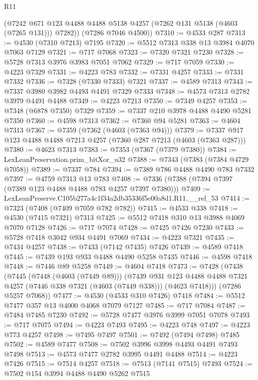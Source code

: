 \begin{lexlean}{R11}
\begin{coremodule}
        (@7242 @671 @123 @4488 @4488 @5138 @4257 (@7262 @131 @5138 (@4603 (@7265 @131))) @7282))
      (@7286 @7046 @4500))
@7310 := @4533 @287
@7313 := @4530 (@7310 @7213) @7195
@7320 := @5512 @7313 @338 @13 @3984 @4070 @7063 @7129
@7321 := @717 @7068
@7323 := @7320 @7321 @7230
@7328 := @5728 @7313 @3976 @3983 @7051 @7062
@7329 := @717 @7059
@7330 := @4223 @7329
@7331 := @4223 @783
@7332 := @7331 @4257
@7333 := @7331 @7332
@7336 := @7328 (@7330 @7333) @7321
@7337 := @4589 @7313
@7343 := @7337 @3980 @3982 @4493 @4491 @7329 @7333
@7348 := @4573 @7313 @2782 @3979 @4491 @4488
@7349 := @4223 @7213
@7350 := @7349 @4257
@7353 := @7348 (@6878 @7350) @7329
@7359 := @7337 @210 @3978 @4488 @4490 @5281 @7350
@7360 := @4598 @7313
@7362 := @7360 @94 @5281
@7363 := @4604 @7313
@7367 := @7359 (@7362 (@4603 (@7363 @94)))
@7379 := @7337 @917 @123 @4488 @4488 @7213 @4257 (@7360 @287 @7213 (@4603 (@7363 @287)))
@7380 := @4623 @7313
@7383 := @7353 (@7367 (@7379 @7380))
@7384 := LexLeanPreservation.prim_bitXor_u32
@7388 := @7343 (@7383 (@7384 @4729 @7058))
@7389 := @7337 @784
@7394 := @7389 @786 @4488 @4490 @783 @7332
@7397 := @4759 @7313 @13 @783
@7408 := @7336 (@7388 (@7394 @7397 (@7389 @123 @4488 @4488 @783 @4257 @7397 @7380)))
@7409 := LexLeanPreserve.C105b277a4c1f34a2db35336f5e00a8d1.R11.__rel_53
@7414 := @7323 (@7408 (@7409 @7059 @782 @782))
@7415 := @4533 @338
@7418 := @4530 (@7415 @7321) @7313
@7425 := @5512 @7418 @310 @13 @3988 @4069 @7070 @7128
@7426 := @717 @7074
@7428 := @7425 @7426 @7230
@7433 := @5728 @7418 @3042 @934 @4491 @7069
@7434 := @4223 @7321
@7435 := @7434 @4257
@7438 := @7433 (@7142 @7435) @7426
@7439 := @4589 @7418
@7445 := @7439 @193 @933 @4488 @4490 @5258 @7435
@7446 := @4598 @7418
@7448 := @7446 @89 @5258
@7449 := @4604 @7418
@7473 := @7428
    (@7438
      (@7445
        (@7448 (@4603 (@7449 @89)))
        (@7439
          @931
          @123
          @4488
          @4488
          @7321
          @4257
          (@7446 @338 @7321 (@4603 (@7449 @338)))
          (@4623 @7418)))
      (@7286 @5257 @7068))
@7477 := @4530 (@4533 @310 @7426) @7418
@7484 := @5512 @7477 @357 @13 @4000 @4068 @7079 @7127
@7485 := @717 @7084
@7487 := @7484 @7485 @7230
@7492 := @5728 @7477 @3976 @3999 @7051 @7078
@7493 := @717 @7075
@7494 := @4223 @7493
@7495 := @4223 @748
@7497 := @4223 @773 @4257
@7498 := @7495 @7497
@7501 := @7492 (@7494 @7498) @7485
@7502 := @4589 @7477
@7508 := @7502 @3996 @3998 @4493 @4491 @7493 @7498
@7513 := @4573 @7477 @2782 @3995 @4491 @4488
@7514 := @4223 @7426
@7515 := @7514 @4257
@7518 := @7513 (@7141 @7515) @7493
@7524 := @7502 @154 @3994 @4488 @4490 @5262 @7515

\end{coremodule}
\end{lexlean}
